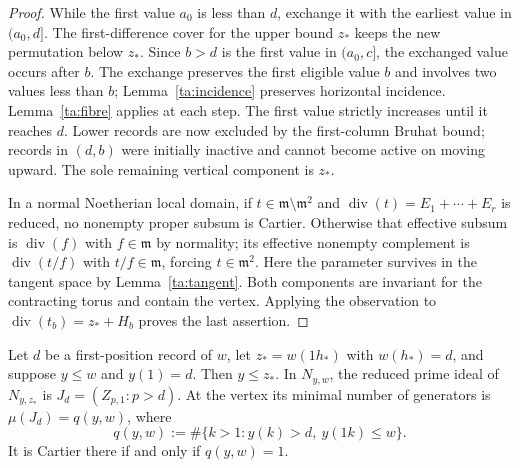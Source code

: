 \begin{proof}
While the first value $a_0$ is less than $d$, exchange it with the
earliest value in $(a_0,d]$. The first-difference cover for the upper
bound $z_*$ keeps the new permutation below $z_*$. Since $b>d$ is
the first value in $(a_0,c]$, the exchanged value occurs after $b$.
The exchange preserves the first eligible value $b$ and involves two
values less than $b$; Lemma~\ref{ta:incidence} preserves horizontal
incidence. Lemma~\ref{ta:fibre} applies at each step.
The first value strictly increases until it reaches $d$.
Lower records are now excluded by the first-column Bruhat bound;
records in $(d,b)$ were initially inactive and cannot become active
on moving upward. The sole remaining vertical component is $z_*$.

In a normal Noetherian local domain, if
$t\in\mathfrak m\setminus\mathfrak m^2$ and
$\operatorname{div}(t)=E_1+\cdots+E_r$ is reduced, no nonempty proper
subsum is Cartier. Otherwise that effective subsum is
$\operatorname{div}(f)$ with $f\in\mathfrak m$ by normality; its
effective nonempty complement is $\operatorname{div}(t/f)$ with
$t/f\in\mathfrak m$, forcing $t\in\mathfrak m^2$.
Here the parameter survives in the tangent space by
Lemma~\ref{ta:tangent}. Both components are invariant for the
contracting torus and contain the vertex. Applying the observation to
$\operatorname{div}(t_b)=z_*+H_b$ proves the last assertion.
\end{proof}

\begin{lemma}\label{ta:column}
Let $d$ be a first-position record of $w$, let $z_*=w(1h_*)$ with
$w(h_*)=d$, and suppose $y\leq w$ and $y(1)=d$.
Then $y\leq z_*$. In $N_{y,w}$, the reduced prime ideal of
$N_{y,z_*}$ is $J_d=(Z_{p,1}:p>d)$. At the vertex its minimal
number of generators is $\mu(J_d)=q(y,w)$, where
\[
 q(y,w):=\#\{k>1:y(k)>d,\ y(1k)\leq w\}.
\]
It is Cartier there if and only if $q(y,w)=1$.
\end{lemma}

